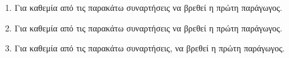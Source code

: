 \documentclass[11pt,a4paper]{article}
\begin{document}
\begin{enumerate}


\item
Για καθεμία από τις παρακάτω συναρτήσεις να βρεθεί η πρώτη παράγωγος.
\begin{multicols}{2}
\end{multicols}


\item
Για καθεμία από τις παρακάτω συναρτήσεις να βρεθεί η πρώτη παράγωγος.
\begin{multicols}{2}
\end{multicols}


\item
Για καθεμία από τις παρακάτω συναρτήσεις, να βρεθεί η πρώτη παράγωγος.
\begin{multicols}{2}
\end{multicols}



\end{enumerate}
\end{document}
